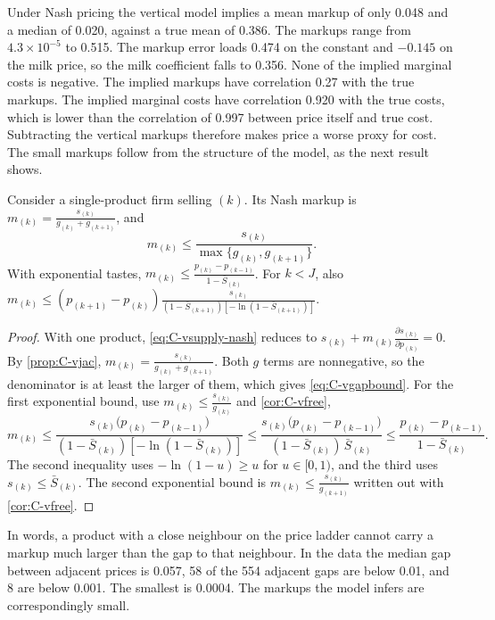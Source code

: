 Under Nash pricing the vertical model implies a mean markup of only 0.048 and a median of 0.020, against a true mean of
0.386. The markups range from $4.3\times10^{-5}$ to 0.515. The markup error loads 0.474 on the constant and $-0.145$
on the milk price, so the milk coefficient falls to 0.356. None of the implied marginal costs is negative. The implied
markups have correlation 0.27 with the true markups. The implied marginal costs have correlation 0.920 with the true
costs, which is lower than the correlation of 0.997 between price itself and true cost. Subtracting the vertical markups
therefore makes price a worse proxy for cost. The small markups follow from the structure of the model, as the next
result shows.

\begin{proposition}\label{prop:C-vgap}
Consider a single-product firm selling $(k)$. Its Nash markup is $m_{(k)} = \frac{s_{(k)}}{g_{(k)} + g_{(k+1)}}$, and
\begin{equation}\label{eq:C-vgapbound}
  m_{(k)} \le \frac{s_{(k)}}{\max\{g_{(k)}, g_{(k+1)}\}} .
\end{equation}
With exponential tastes, $m_{(k)} \le \frac{p_{(k)} - p_{(k-1)}}{1 - \bar S_{(k)}}$. For $k < J$, also
$m_{(k)} \le (p_{(k+1)} - p_{(k)})\frac{s_{(k)}}{(1 - \bar S_{(k+1)})\left[-\ln(1 - \bar S_{(k+1)})\right]}$.
\end{proposition}

\begin{proof}
With one product, \eqref{eq:C-vsupply-nash} reduces to $s_{(k)} + m_{(k)}\frac{\partial s_{(k)}}{\partial p_{(k)}} = 0$.
By \cref{prop:C-vjac}, $m_{(k)} = \frac{s_{(k)}}{g_{(k)} + g_{(k+1)}}$. Both $g$ terms are nonnegative, so the denominator
is at least the larger of them, which gives \eqref{eq:C-vgapbound}. For the first exponential bound, use
$m_{(k)} \le \frac{s_{(k)}}{g_{(k)}}$ and \cref{cor:C-vfree},
\[
  m_{(k)} \le \frac{s_{(k)}\big(p_{(k)} - p_{(k-1)}\big)}{(1 - \bar S_{(k)})\left[-\ln(1 - \bar S_{(k)})\right]}
  \le \frac{s_{(k)}\big(p_{(k)} - p_{(k-1)}\big)}{(1 - \bar S_{(k)})\,\bar S_{(k)}}
  \le \frac{p_{(k)} - p_{(k-1)}}{1 - \bar S_{(k)}} .
\]
The second inequality uses $-\ln(1 - u) \ge u$ for $u \in [0, 1)$, and the third uses $s_{(k)} \le \bar S_{(k)}$. The
second exponential bound is $m_{(k)} \le \frac{s_{(k)}}{g_{(k+1)}}$ written out with \cref{cor:C-vfree}.
\end{proof}

In words, a product with a close neighbour on the price ladder cannot carry a markup much larger than the gap to that
neighbour. In the data the median gap between adjacent prices is 0.057, 58 of the 554 adjacent gaps are below 0.01, and
8 are below 0.001. The smallest is 0.0004. The markups the model infers are correspondingly small.

